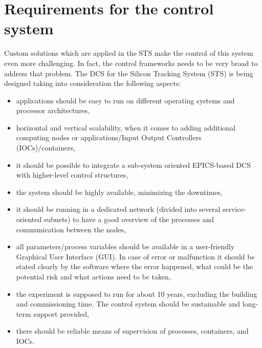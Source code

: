 \section{Requirements for the control system} 
Custom solutions which are applied in the \gls{STS} make the control of this system even more challenging. In fact, the control frameworks needs to be very broad to address that problem.
 The \gls{DCS} for the Silicon Tracking System (\gls{STS}) is being designed taking into consideration the following aspects:
 \begin{itemize}
     \item applications should be easy to run on different operating systems and processor architectures,
     \item horizontal and vertical scalability, when it comes to adding additional computing nodes or applications/Input Output Controllers (\glspl{IOC})/containers,
     \item it should be possible to integrate a sub-system oriented \gls{EPICS}-based \gls{DCS} with higher-level control structures,
     \item the system should be highly available, minimizing the downtimes,
     \item it should be running in a dedicated network (divided into several service-oriented subnets) to have a good overview of the processes and communication between the nodes,
     \item all parameters/process variables should be available in a user-friendly Graphical User Interface (\gls{GUI}). In case of error or malfunction it should be stated clearly by the software where the error happened, what could be the potential risk and what actions need to be taken,
     \item the experiment is supposed to run for about 10 years, excluding the building and commissioning time. The control system should be sustainable and long-term support provided,
     \item there should be reliable means of supervision of processes, containers, and \glspl{IOC}.
 \end{itemize}


